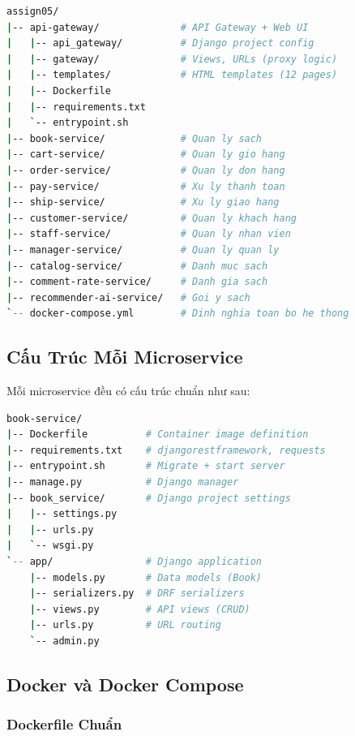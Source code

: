 \documentclass[12pt,a4paper]{article}
\begin{document}
\begin{lstlisting}[language=bash, caption={Cấu trúc thư mục tổng thể dự án}]
assign05/
|-- api-gateway/              # API Gateway + Web UI
|   |-- api_gateway/          # Django project config
|   |-- gateway/              # Views, URLs (proxy logic)
|   |-- templates/            # HTML templates (12 pages)
|   |-- Dockerfile
|   |-- requirements.txt
|   `-- entrypoint.sh
|-- book-service/             # Quan ly sach
|-- cart-service/             # Quan ly gio hang
|-- order-service/            # Quan ly don hang
|-- pay-service/              # Xu ly thanh toan
|-- ship-service/             # Xu ly giao hang
|-- customer-service/         # Quan ly khach hang
|-- staff-service/            # Quan ly nhan vien
|-- manager-service/          # Quan ly quan ly
|-- catalog-service/          # Danh muc sach
|-- comment-rate-service/     # Danh gia sach
|-- recommender-ai-service/   # Goi y sach
`-- docker-compose.yml        # Dinh nghia toan bo he thong
\end{lstlisting}

\subsection{Cấu Trúc Mỗi Microservice}

Mỗi microservice đều có cấu trúc chuẩn như sau:

\begin{lstlisting}[language=bash, caption={Cấu trúc chuẩn mỗi microservice (ví dụ: book-service)}]
book-service/
|-- Dockerfile          # Container image definition
|-- requirements.txt    # djangorestframework, requests
|-- entrypoint.sh       # Migrate + start server
|-- manage.py           # Django manager
|-- book_service/       # Django project settings
|   |-- settings.py
|   |-- urls.py
|   `-- wsgi.py
`-- app/                # Django application
    |-- models.py       # Data models (Book)
    |-- serializers.py  # DRF serializers
    |-- views.py        # API views (CRUD)
    |-- urls.py         # URL routing
    `-- admin.py
\end{lstlisting}

\subsection{Docker và Docker Compose}

\subsubsection{Dockerfile Chuẩn}
\end{document}
